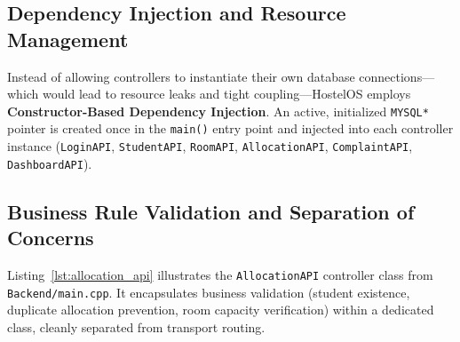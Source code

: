 \documentclass[12pt,a4paper]{article}
\begin{document}
\subsection{Dependency Injection and Resource Management}
\label{sec:dep_injection}
Instead of allowing controllers to instantiate their own database connections—which would lead to resource leaks and tight coupling—HostelOS employs \textbf{Constructor-Based Dependency Injection}. An active, initialized \texttt{MYSQL*} pointer is created once in the \texttt{main()} entry point and injected into each controller instance (\texttt{LoginAPI}, \texttt{StudentAPI}, \texttt{RoomAPI}, \texttt{AllocationAPI}, \texttt{ComplaintAPI}, \texttt{DashboardAPI}).

\subsection{Business Rule Validation and Separation of Concerns}
\label{sec:sep_concerns}
Listing~\ref{lst:allocation_api} illustrates the \texttt{AllocationAPI} controller class from \texttt{Backend/main.cpp}. It encapsulates business validation (student existence, duplicate allocation prevention, room capacity verification) within a dedicated class, cleanly separated from transport routing.
\end{document}
